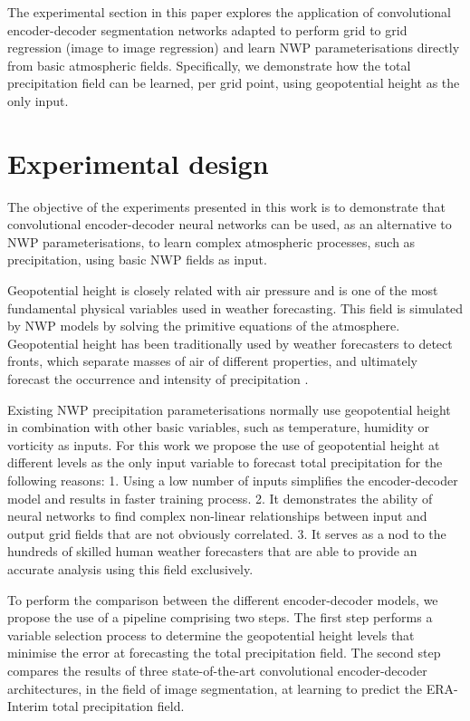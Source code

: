 \documentclass[twocol]{ametsoc}
\begin{document}
The experimental section in this paper explores the application of convolutional encoder-decoder segmentation networks adapted to perform grid to grid regression (image to image regression) and learn NWP parameterisations directly from basic atmospheric fields. Specifically, we demonstrate how the total precipitation field can be learned, per grid point, using geopotential height as the only input.


\section{Experimental design}

The objective of the experiments presented in this work is to demonstrate that convolutional encoder-decoder neural networks can be used, as an alternative to NWP parameterisations, to learn complex atmospheric processes, such as precipitation, using basic NWP fields as input.

Geopotential height is closely related with air pressure and is one of the most fundamental physical variables used in weather forecasting. This field is simulated by NWP models by solving the primitive equations of the atmosphere. Geopotential height has been traditionally used by weather forecasters to detect fronts, which separate masses of air of different properties, and ultimately forecast the occurrence and intensity of precipitation \citep{renard1965experiments,hope2014comparison}.

Existing NWP precipitation parameterisations normally use geopotential height in combination with other basic variables, such as temperature, humidity or vorticity as inputs. For this work we propose the use of geopotential height at different levels as the only input variable to forecast total precipitation for the following reasons: 1. Using a low number of inputs simplifies the encoder-decoder model and results in faster training process. 2. It demonstrates the ability of neural networks to find complex non-linear relationships between input and output grid fields that are not obviously correlated. 3. It serves as a nod to the hundreds of skilled human weather forecasters that are able to provide an accurate analysis using this field exclusively.

To perform the comparison between the different encoder-decoder models, we propose the use of a pipeline comprising two steps. The first step performs a variable selection process to determine the geopotential height levels that minimise the error at forecasting the total precipitation field. The second step compares the results of three state-of-the-art convolutional encoder-decoder architectures, in the field of image segmentation, at learning to predict the ERA-Interim total precipitation field.
\end{document}
